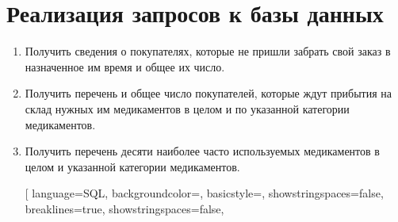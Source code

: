 \documentclass[a4paper]{article}
\begin{document}
	\section{Реализация запросов к базы данных}
		\begin{enumerate}			
			\item Получить сведения о покупателях, которые не пришли забрать свой заказ в назначенное им время и общее их число.
				
				
			\item Получить перечень и общее число покупателей, которые ждут прибытия на склад нужных им медикаментов в целом и по указанной категории медикаментов.
				
				
				
				
			\item Получить перечень десяти наиболее часто используемых медикаментов в целом и указанной категории медикаментов.
				
				[
					language=SQL,
					backgroundcolor=\color{backcolour},
					basicstyle=\scriptsize,
					showstringspaces=false,
					breaklines=true,
					showstringspaces=false,

\end{enumerate}
\end{document}
